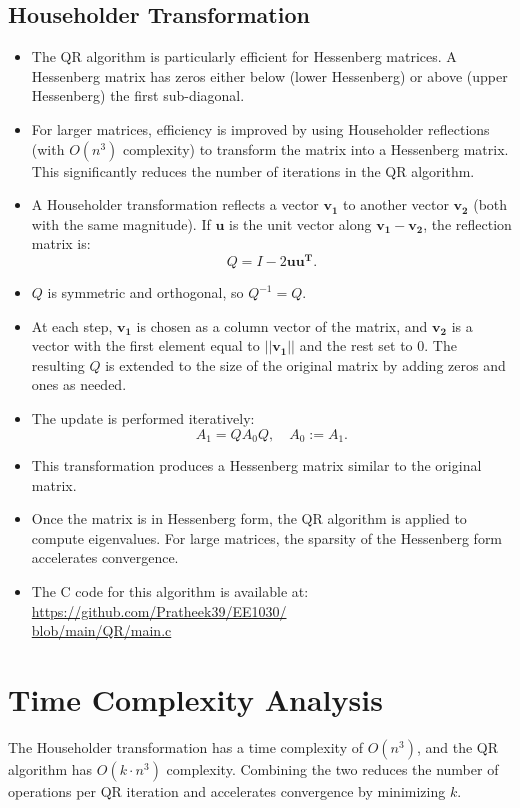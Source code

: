 \documentclass[12pt,letterpaper,onecolumn]{exam}
\begin{document}
\subsection{Householder Transformation}
\begin{itemize}
    \item The QR algorithm is particularly efficient for Hessenberg matrices. A Hessenberg matrix has zeros either below (lower Hessenberg) or above (upper Hessenberg) the first sub-diagonal.
    \item For larger matrices, efficiency is improved by using Householder reflections (with $O(n^3)$ complexity) to transform the matrix into a Hessenberg matrix. This significantly reduces the number of iterations in the QR algorithm.
    \item A Householder transformation reflects a vector $\mathbf{v_1}$ to another vector $\mathbf{v_2}$ (both with the same magnitude). If $\mathbf{u}$ is the unit vector along $\mathbf{v_1} - \mathbf{v_2}$, the reflection matrix is:
    \[
    Q = I - 2\mathbf{uu^{T}}.
    \]
    \item $Q$ is symmetric and orthogonal, so $Q^{-1} = Q$.
    \item At each step, $\mathbf{v_1}$ is chosen as a column vector of the matrix, and $\mathbf{v_2}$ is a vector with the first element equal to $||\mathbf{v_1}||$ and the rest set to 0. The resulting $Q$ is extended to the size of the original matrix by adding zeros and ones as needed.
    \item The update is performed iteratively:
    \[
    A_1 = Q A_0 Q, \quad A_0 := A_1.
    \]
    \item This transformation produces a Hessenberg matrix similar to the original matrix.
    \item Once the matrix is in Hessenberg form, the QR algorithm is applied to compute eigenvalues. For large matrices, the sparsity of the Hessenberg form accelerates convergence.
    \item The C code for this algorithm is available at:
    \href{https://github.com/Pratheek39/EE1030/blob/120977af296ad194235d07bdbaafdb19f6b0e856/QR/main.c}{https://github.com/Pratheek39/EE1030/\\blob/main/QR/main.c}
\end{itemize}

\section{Time Complexity Analysis}
The Householder transformation has a time complexity of $O(n^3)$, and the QR algorithm has $O(k \cdot n^3)$ complexity. Combining the two reduces the number of operations per QR iteration and accelerates convergence by minimizing $k$.
\end{document}
